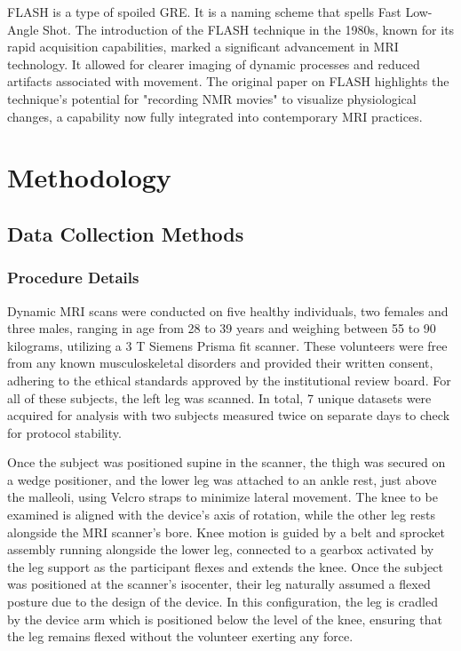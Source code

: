 \documentclass{micro-econ-thesis}
\begin{document}
FLASH is a type of spoiled GRE. It is a naming scheme that spells Fast Low-Angle Shot. \parencite{haase_flash_1986} The introduction of the FLASH technique in the 1980s, known for its rapid acquisition capabilities, marked a significant advancement in MRI technology. It allowed for clearer imaging of dynamic processes and reduced artifacts associated with movement. The original paper on FLASH highlights the technique's potential for "recording NMR movies" to visualize physiological changes, a capability now fully integrated into contemporary MRI practices.

\section{Methodology}
\label{sec:second}

\subsection{Data Collection Methods}

\subsubsection{Procedure Details}
Dynamic MRI scans were conducted on five healthy individuals, two females and three males, ranging in age from 28 to 39 years and weighing between 55 to 90 kilograms, utilizing a 3 T Siemens Prisma fit scanner. These volunteers were free from any known musculoskeletal disorders and provided their written consent, adhering to the ethical standards approved by the institutional review board. For all of these subjects, the left leg was scanned. In total, 7 unique datasets were acquired for analysis with two subjects measured twice on separate days to check for protocol stability. 


Once the subject was positioned supine in the scanner, the thigh was secured on a wedge positioner, and the lower leg was attached to an ankle rest, just above the malleoli, using Velcro straps to minimize lateral movement. The knee to be examined is aligned with the device’s axis of rotation, while the other leg rests alongside the MRI scanner's bore.  Knee motion is guided by a belt and sprocket assembly running alongside the lower leg, connected to a gearbox activated by the leg support as the participant flexes and extends the knee. Once the subject was positioned at the scanner's isocenter, their leg naturally assumed a flexed posture due to the design of the device. In this configuration, the leg is cradled by the device arm which is positioned below the level of the knee, ensuring that the leg remains flexed without the volunteer exerting any force.
\end{document}
